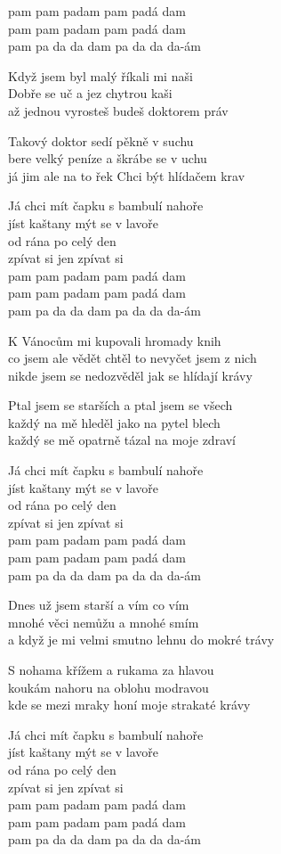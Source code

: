 \begin{text}
pam pam padam pam padá dam\\
pam pam padam pam padá dam\\
pam pa da da dam pa da da da-ám

Když jsem byl malý říkali mi naši\\
Dobře se uč a jez chytrou kaši\\
až jednou vyrosteš budeš doktorem práv

Takový doktor sedí pěkně v suchu\\
bere velký peníze a škrábe se v uchu\\
já jim ale na to řek Chci být hlídačem krav

Já chci mít čapku s bambulí nahoře\\
jíst kaštany mýt se v lavoře\\
od rána po celý den\\
zpívat si jen zpívat si\\
pam pam padam pam padá dam\\
pam pam padam pam padá dam\\
pam pa da da dam pa da da da-ám

K Vánocům mi kupovali hromady knih\\
co jsem ale vědět chtěl to nevyčet jsem z nich\\
nikde jsem se nedozvěděl jak se hlídají krávy

Ptal jsem se starších a ptal jsem se všech\\
každý na mě hleděl jako na pytel blech\\
každý se mě opatrně tázal na moje zdraví

Já chci mít čapku s bambulí nahoře\\
jíst kaštany mýt se v lavoře\\
od rána po celý den\\
zpívat si jen zpívat si\\
pam pam padam pam padá dam\\
pam pam padam pam padá dam\\
pam pa da da dam pa da da da-ám

Dnes už jsem starší a vím co vím\\
mnohé věci nemůžu a mnohé smím\\
a když je mi velmi smutno lehnu do mokré trávy

S nohama křížem a rukama za hlavou\\
koukám nahoru na oblohu modravou\\
kde se mezi mraky honí moje strakaté krávy

Já chci mít čapku s bambulí nahoře\\
jíst kaštany mýt se v lavoře\\
od rána po celý den\\
zpívat si jen zpívat si\\
pam pam padam pam padá dam\\
pam pam padam pam padá dam\\
pam pa da da dam pa da da da-ám
\end{text}